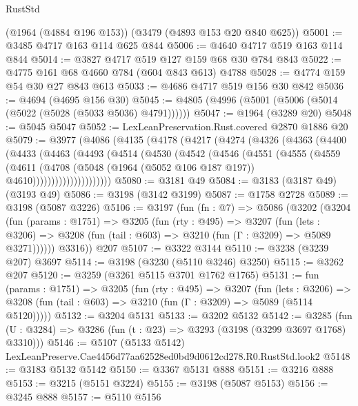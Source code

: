 \begin{lexlean}{RustStd}
\begin{coremodule}
    (@1964 (@4884 @196 @153))
    (@3479 (@4893 @153 @20 @840 @625))
@5001 := @3485 @4717 @163 @114 @625 @844
@5006 := @4640 @4717 @519 @163 @114 @844
@5014 := @3827 @4717 @519 @127 @159 @68 @30 @784 @843
@5022 := @4775 @161 @68 @4660 @784 (@604 @843 @613) @4788
@5028 := @4774 @159 @54 @30 @27 @843 @613
@5033 := @4686 @4717 @519 @156 @30 @842
@5036 := @4694 (@4695 @156 @30)
@5045 := @4805 (@4996 (@5001 (@5006 (@5014 (@5022 (@5028 (@5033 @5036) @4791))))))
@5047 := @1964 (@3289 @20)
@5048 := @5045 @5047
@5052 := LexLeanPreservation.Rust.covered @2870 @1886 @20
@5079 := @3977
    (@4086
      (@4135
        (@4178
          (@4217
            (@4274
              (@4326
                (@4363
                  (@4400
                    (@4433
                      (@4463
                        (@4493
                          (@4514
                            (@4530
                              (@4542
                                (@4546
                                  (@4551
                                    (@4555
                                      (@4559
                                        (@4611
                                          (@4708
                                            (@5048
                                              (@1964 (@5052 @106 @187 @197))
                                              @4610)))))))))))))))))))))
@5080 := @3181 @49
@5084 := @3183 (@3187 @49) (@3193 @49)
@5086 := @3198 (@3142 @3199)
@5087 := @1758 @2728
@5089 := @3198 (@5087 @3226)
@5106 := @3197
    (fun (fn : @7) =>
    @5086
      (@3202
        (@3204
          (fun (params : @1751) =>
          @3205
            (fun (rty : @495) =>
            @3207
              (fun (lets : @3206) =>
              @3208 (fun (tail : @603) => @3210 (fun (Γ : @3209) => @5089 @3271))))))
        @3316))
    @207
@5107 := @3322 @3144
@5110 := @3238 (@3239 @207) @3697
@5114 := @3198 (@3230 (@5110 @3246) @3250)
@5115 := @3262 @207
@5120 := @3259 (@3261 @5115 @3701 @1762 @1765)
@5131 := fun (params : @1751) =>
  @3205
    (fun (rty : @495) =>
    @3207
      (fun (lets : @3206) =>
      @3208 (fun (tail : @603) => @3210 (fun (Γ : @3209) => @5089 (@5114 @5120)))))
@5132 := @3204 @5131
@5133 := @3202 @5132
@5142 := @3285 (fun (U : @3284) => @3286 (fun (t : @23) => @3293 (@3198 (@3299 @3697 @1768) @3310)))
@5146 := @5107 (@5133 @5142) LexLeanPreserve.Cae4456d77aa62528ed0bd9d0612cd278.R0.RustStd.look2
@5148 := @3183 @5132 @5142
@5150 := @3367 @5131 @888
@5151 := @3216 @888
@5153 := @3215 (@5151 @3224)
@5155 := @3198 (@5087 @5153)
@5156 := @3245 @888
@5157 := @5110 @5156

\end{coremodule}
\end{lexlean}
